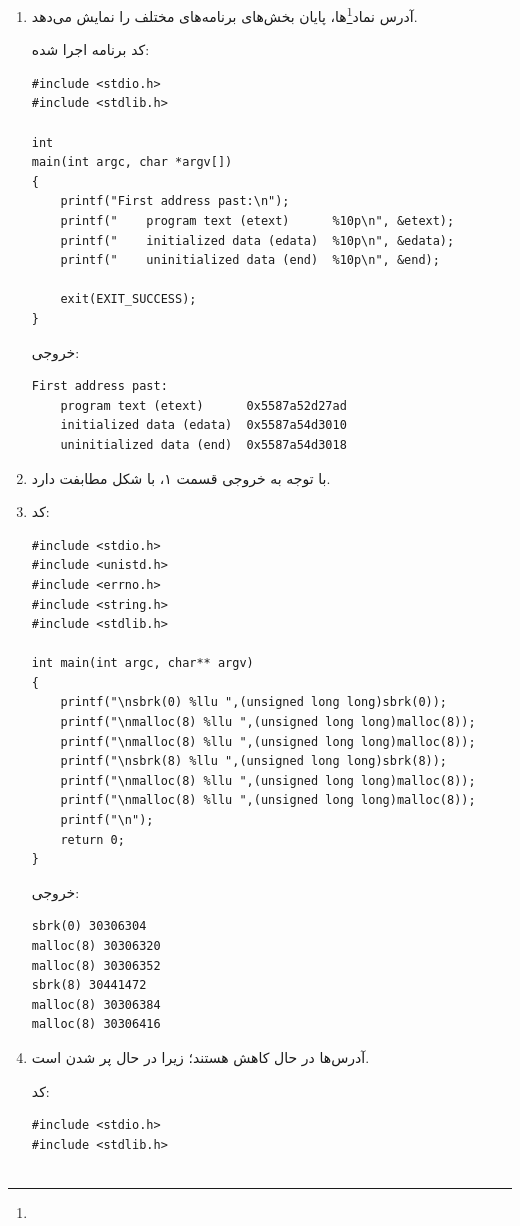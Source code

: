 \begin{enumerate}
	\item آدرس نماد\footnote{}ها، پایان بخش‌های برنامه‌های مختلف را نمایش می‌دهد. 

	کد برنامه اجرا شده:
	\begin{Verbatim}[tabsize=4]
#include <stdio.h>
#include <stdlib.h>

int
main(int argc, char *argv[])
{
	printf("First address past:\n");
	printf("    program text (etext)      %10p\n", &etext);
	printf("    initialized data (edata)  %10p\n", &edata);
	printf("    uninitialized data (end)  %10p\n", &end);
	
	exit(EXIT_SUCCESS);
}

	\end{Verbatim}
	
	خروجی:
	
	\begin{Verbatim}[tabsize=4]
First address past:
	program text (etext)      0x5587a52d27ad
	initialized data (edata)  0x5587a54d3010
	uninitialized data (end)  0x5587a54d3018
	\end{Verbatim}
	\item با توجه به خروجی قسمت ۱، با  شکل مطابفت دارد.
	
	\item 
	کد:
	
	\begin{Verbatim}[tabsize=4]
#include <stdio.h>
#include <unistd.h>
#include <errno.h>
#include <string.h>
#include <stdlib.h>

int main(int argc, char** argv)
{
	printf("\nsbrk(0) %llu ",(unsigned long long)sbrk(0));
	printf("\nmalloc(8) %llu ",(unsigned long long)malloc(8));
	printf("\nmalloc(8) %llu ",(unsigned long long)malloc(8));
	printf("\nsbrk(8) %llu ",(unsigned long long)sbrk(8));
	printf("\nmalloc(8) %llu ",(unsigned long long)malloc(8));
	printf("\nmalloc(8) %llu ",(unsigned long long)malloc(8));  
	printf("\n");
	return 0;
}
	\end{Verbatim}

	خروجی:
	\begin{Verbatim}[tabsize=4]
sbrk(0) 30306304 
malloc(8) 30306320 
malloc(8) 30306352 
sbrk(8) 30441472 
malloc(8) 30306384 
malloc(8) 30306416 
	\end{Verbatim}
	\item 
	آدرس‌ها در حال کاهش هستند؛ زیرا  در حال پر شدن است.
	
	کد: 
	
	\begin{Verbatim}[tabsize=4]
#include <stdio.h>
#include <stdlib.h>


\end{Verbatim}
\end{enumerate}
